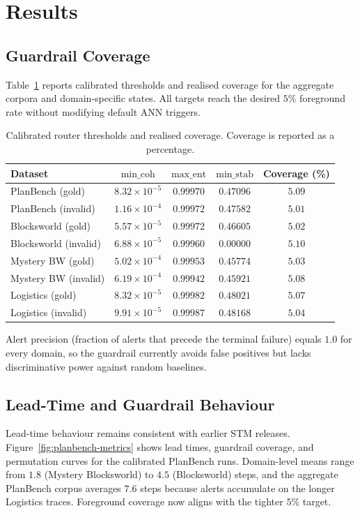 \documentclass[11pt]{article}
\begin{document}
\section{Results}
\subsection{Guardrail Coverage}
Table~\ref{tab:coverage} reports calibrated thresholds and realised coverage for
the aggregate corpora and domain-specific states. All targets reach the desired
$5\%$ foreground rate without modifying default ANN triggers.

\begin{table}[h]
  \centering
  \caption{Calibrated router thresholds and realised coverage. Coverage is reported as a percentage.}
  \label{tab:coverage}
  \begin{tabular}{lcccc}
    \toprule
    Dataset & $\text{min\_coh}$ & $\text{max\_ent}$ & $\text{min\_stab}$ & Coverage (\%) \\
    \midrule
    PlanBench (gold) & $8.32\times10^{-5}$ & $0.99970$ & $0.47096$ & $5.09$ \\
    PlanBench (invalid) & $1.16\times10^{-4}$ & $0.99972$ & $0.47582$ & $5.01$ \\
    Blocksworld (gold) & $5.57\times10^{-5}$ & $0.99972$ & $0.46605$ & $5.02$ \\
    Blocksworld (invalid) & $6.88\times10^{-5}$ & $0.99960$ & $0.00000$ & $5.10$ \\
    Mystery BW (gold) & $5.02\times10^{-4}$ & $0.99953$ & $0.45774$ & $5.03$ \\
    Mystery BW (invalid) & $6.19\times10^{-4}$ & $0.99942$ & $0.45921$ & $5.08$ \\
    Logistics (gold) & $8.32\times10^{-5}$ & $0.99982$ & $0.48021$ & $5.07$ \\
    Logistics (invalid) & $9.91\times10^{-5}$ & $0.99987$ & $0.48168$ & $5.04$ \\
    \bottomrule
  \end{tabular}
\end{table}
Alert precision (fraction of alerts that precede the terminal failure) equals $1.0$ for every domain, so the guardrail currently avoids false positives but lacks discriminative power against random baselines.


\subsection{Lead-Time and Guardrail Behaviour}
Lead-time behaviour remains consistent with earlier STM releases. Figure~\ref{fig:planbench-metrics}
shows lead times, guardrail coverage, and permutation curves for the calibrated
PlanBench runs. Domain-level means range from $1.8$ (Mystery Blocksworld) to
$4.5$ (Blocksworld) steps, and the aggregate PlanBench corpus averages $7.6$
steps because alerts accumulate on the longer Logistics traces. Foreground
coverage now aligns with the tighter $5\%$ target.
\end{document}
